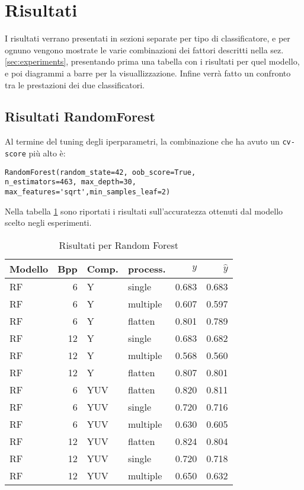 \section{Risultati}
I risultati verrano presentati in sezioni separate per tipo di classificatore, e per ognuno vengono mostrate le varie combinazioni dei fattori descritti nella sez. \ref{sec:experiments}, presentando prima una tabella con i risultati per quel modello, e poi diagrammi a barre per la visuallizzazione.
Infine verrà fatto un confronto tra le prestazioni dei due classificatori.
\subsection{Risultati RandomForest}
Al termine del tuning degli iperparametri, la combinazione che ha avuto un \texttt{cv-score} più alto è:
\begin{lstlisting}[style=pythonElegant, caption={Miglior combinazione di parametri per RandomForestClassifier} ]
RandomForest(random_state=42, oob_score=True,
n_estimators=463, max_depth=30, max_features='sqrt',min_samples_leaf=2)
\end{lstlisting}
Nella tabella \ref{tab:RF-results-table} sono riportati i risultati sull'accuratezza ottenuti dal modello scelto negli esperimenti. 
\begin{table}[H]
\centering
\caption{Risultati per Random Forest}\label{tab:RF-results-table}
\begin{tabular}{lrllrr}
\toprule
Modello &  Bpp &  Comp. &     process. &     $y$ &  $\hat{y}$ \\
\midrule
RF &  6 &       Y &   single & 0.683 &  0.683 \\
RF &  6 &       Y & multiple & 0.607 &  0.597 \\
RF &  6 &       Y & flatten & 0.801 & 0.789  \\
RF & 12 &       Y &   single & 0.683 &  0.682 \\
RF & 12 &       Y & multiple & 0.568 &  0.560 \\
RF &  12 &       Y & flatten &  0.807&  0.801\\

\midrule
RF &  6 &     YUV &  flatten & 0.820 &  0.811 \\
RF &  6 &     YUV &   single & 0.720 &  0.716 \\
RF &  6 &     YUV & multiple & 0.630 &  0.605 \\
RF & 12 &     YUV &  flatten & 0.824 &  0.804 \\
RF & 12 &     YUV &   single & 0.720 &  0.718 \\
RF & 12 &     YUV & multiple & 0.650 &  0.632 \\
\bottomrule
\end{tabular}
\end{table}

